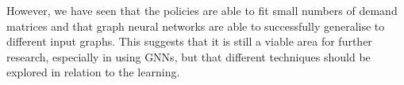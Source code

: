 However, we have seen that the policies are able to fit small numbers of demand matrices and that graph neural networks are able to successfully generalise to different input graphs. This suggests that it is still a viable area for further research, especially in using GNNs, but that different techniques should be explored in relation to the learning.

